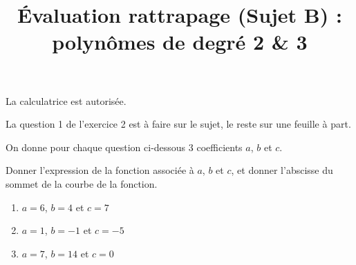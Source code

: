 \documentclass[
	classe=$1^{ere}STI2D$,
	headerTitle=Évaluation\space Chapitre\space 4
]{évaluation}
\begin{document}
\newpage
\setcounter{exercice}{1}

\title{Évaluation rattrapage (Sujet B) : polynômes de degré 2 \& 3}
\maketitle

\begin{tcolorbox}
	La calculatrice est autorisée.

	La question 1 de l'exercice 2 est à faire sur le sujet, le reste sur une feuille à part.
\end{tcolorbox}

\begin{exercice}
	On donne pour chaque question ci-dessous 3 coefficients $a$, $b$ et $c$.

	Donner l'expression de la fonction associée à $a$, $b$ et $c$, et donner l'abscisse du sommet de la courbe de la fonction.
	\begin{enumerate}
		\item $a = 6$, $b = 4$ et $c = 7$

		      \ifdefined{}\fi
		\item $a = 1$, $b = -1$ et $c = -5$

		      \ifdefined{}\fi
		\item $a = 7$, $b = 14$ et $c = 0$

		      \ifdefined{}\fi
	\end{enumerate}
\end{exercice}
\end{document}
